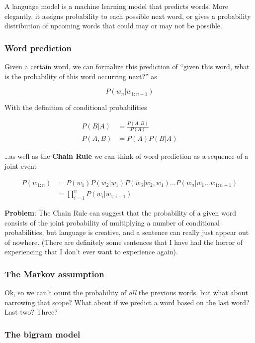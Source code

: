 \documentclass[11pt]{article}
\begin{document}
A language model is a machine learning model that predicts words. More
elegantly, it assigns probability to each possible next word, or gives a
probability distribution of upcoming words that could may or may not be
possible.

\subsubsection{Word prediction}

Given a certain word, we can formalize this prediction of ``given this word,
what is the probability of this word occurring next?'' as

\begin{equation*}
	P(w_n | w_{1:n-1})
\end{equation*}

With the definition of conditional probabilities

\begin{align*}
	P(B|A) & = \frac{P(A,B)}{P(A)} \\
	P(A,B) & = P(A)P(B|A)
\end{align*}

\ldots as well as the \textbf{Chain Rule} we can think of word prediction as a
sequence of a joint event

\begin{align*}
	P(w_{1:n}) & = P(w_1)P(w_2|w_1)P(w_3|w_2,w_1) \dots P(w_n | w_1 \dots w_{1:n-1}) \\
	           & = \prod_{i=1}^n P(w_i | w_{1:i-1})
\end{align*}

\textbf{Problem}: The Chain Rule can suggest that the probability of a given
word consists of the joint probability of multiplying a number of conditional
probabilities, but language is creative, and a sentence can really just appear
out of nowhere. (There are definitely some sentences that I have had the horror
of experiencing that I don't ever want to experience again).

\subsubsection{The Markov assumption}

Ok, so we can't count the probability of \textit{all} the previous words, but
what about narrowing that scope? What about if we predict a word based on the
last word? Last two? Three?

\subsubsection*{The bigram model}
\end{document}
